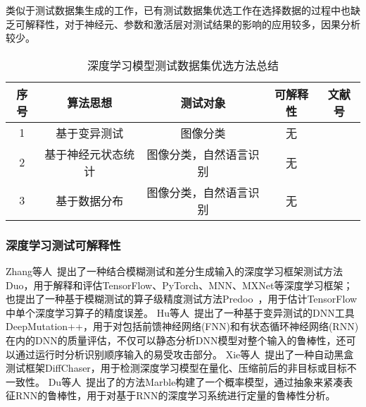 类似于测试数据集生成的工作，已有测试数据集优选工作在选择数据的过程中也缺乏可解释性，对于神经元、参数和激活层对测试结果的影响的应用较多，因果分析较少。



\begin{table}[t]
	\small
	\centering
	\caption{深度学习模型测试数据集优选方法总结}
	\label{tab:testingDataPri}
	\begin{tabular}{ccccc}
		\toprule
		\textbf{序号} & \textbf{算法思想}  & \textbf{测试对象}      & \textbf{可解释性} & \textbf{文献号}                                                    \\
		\midrule
		1             & 基于变异测试       & 图像分类               & 无                & \cite{Wang2021Prioritizing,Ma2018DeepMutation}                     \\
		2             & 基于神经元状态统计 & 图像分类，自然语言识别 & 无                & \cite{Liu2022DeepState,Byun2019Input,Gao2022Adaptive}              \\
		3             & 基于数据分布       & 图像分类，自然语言识别 & 无                & \cite{Shen2020MultipleBoundary,Feng2020DeepGini,Hu2022AnEmpirical} \\
		\bottomrule
	\end{tabular}
\end{table}






\subsubsection{深度学习测试可解释性}

\iffalse
	Zhang等人~提出了一种结合模糊测试和差分生成输入的深度学习框架测试方法Duo，用于解释和评估TensorFlow、PyTorch、MNN、MXNet等深度学习框架；也提出了一种基于模糊测试的算子级精度测试方法Predoo~，用于估计TensorFlow中单个深度学习算子的精度误差。
	Hu等人~提出了一种基于变异测试的DNN工具DeepMutation++，用于对包括前馈神经网络(FNN)和有状态循环神经网络(RNN)在内的DNN的质量评估，不仅可以静态分析DNN模型对整个输入的鲁棒性，还可以通过运行时分析识别顺序输入的易受攻击部分。
	Xie等人~提出了一种自动黑盒测试框架DiffChaser，用于检测深度学习模型在量化、压缩前后的非目标或目标不一致性。
	Du等人~提出了的方法Marble构建了一个概率模型，通过抽象来紧凑表征RNN的鲁棒性，用于对基于RNN的深度学习系统进行定量的鲁棒性分析。


